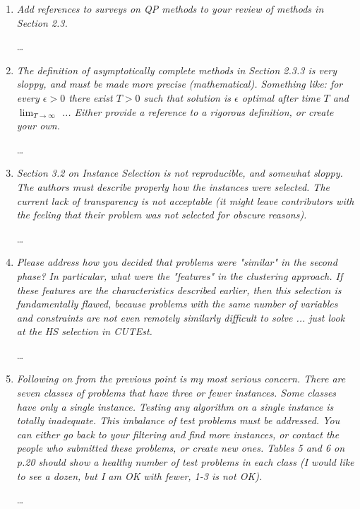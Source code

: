\documentclass[11pt]{article}
\newcommand{\rep}[1]{{\textcolor{acblue}{#1}}}
\begin{document}
\begin{enumerate}
\rep{\dots}

\item 
{\it
 Add references to surveys on QP methods to your review of methods in Section 2.3. 
}

\rep{\dots}

\item 
{\it
 The definition of asymptotically complete methods in Section 2.3.3 is very sloppy, 
and must be made more precise (mathematical). Something like: for every $\epsilon>0$ 
there exist $T>0$ such that solution is $\epsilon$ optimal after time $T$ and 
$\lim_{T\to\infty}$ ... Either provide a reference to a rigorous definition, or create 
your own. 
}

\rep{\dots}

\item 
{\it
 Section 3.2 on Instance Selection is not reproducible, and somewhat sloppy. The authors 
must describe properly how the instances were selected. The current lack of transparency 
is not acceptable (it might leave contributors with the feeling that their problem was 
not selected for obscure reasons). 
}


\rep{\dots}

\item 
{\it
Please address how you decided that problems were "similar" in the second phase? 
In particular, what were the "features" in the clustering approach. If these features 
are the characteristics described earlier, then this selection is fundamentally flawed, 
because problems with the same number of variables and constraints are not even remotely 
similarly difficult to solve ... just look at the HS selection in CUTEst. 
}

\rep{\dots}

\item 
{\it
 Following on from the previous point is my most serious concern. There are seven classes 
of problems that have three or fewer instances. Some classes have only a single instance. 
Testing any algorithm on a single instance is totally inadequate. This imbalance of 
test problems must be addressed. You can either go back to your filtering and find more 
instances, or contact the people who submitted these problems, or create new ones. 
Tables 5 and 6 on p.20 should show a healthy number of test problems in each class (I 
would like to see a dozen, but I am OK with fewer, 1-3 is not OK).
}

\rep{\dots}

 \end{enumerate}
\end{document}
